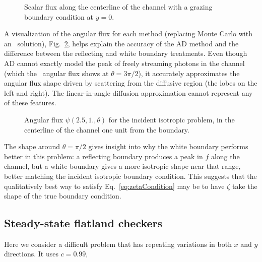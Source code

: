 \begin{figure}[htb]
  \centering\small
  \hspace{-.5in}
  
  \hspace{-.5in}
  \caption{Scalar flux along the centerline of the channel with a grazing
  boundary condition at $y=0$.}
  \label{fig:bcChannelGrazing}
\end{figure}

A visualization of the angular flux for each method (replacing Monte Carlo with
an \SN\ solution), Fig.~\ref{fig:bcChannelIsotropicAngular}, helps explain the
accuracy
of the AD method and the difference between the reflecting and white boundary
treatments. Even though AD cannot exactly model the peak of freely streaming
photons in the channel (which the \SN\ angular flux shows at $\theta=3\pi/2$),
it accurately approximates the angular flux shape driven by scattering from the
diffusive region (the lobes on the left and right).
The linear-in-angle diffusion approximation cannot represent any of these
features.  

\begin{figure}[htb!]
  \centering\small
  \vspace{-.25in}
  \hspace{-.5in}
  
  \hspace{-.5in}
  \vspace{-.25in}
  \caption{Angular flux $\psi(2.5, 1., \theta)$ for the incident isotropic
  problem, in the centerline of the channel one unit from the boundary.}
  \label{fig:bcChannelIsotropicAngular}
\end{figure}

The shape around $\theta=\pi/2$ gives insight into why the white boundary
performs better in this problem: a reflecting boundary produces a peak in $f$
along the channel, but a white boundary gives a more isotropic shape near that
range, better matching the incident isotropic boundary condition. This suggests
that the qualitatively best way to satisfy Eq.~\eqref{eq:zetaCondition} may be
to have $\zeta$ take the shape of the true boundary condition.

\clearpage
\subsection{Steady-state flatland checkers}

Here we consider a difficult problem that has repeating variations in both $x$
and $y$ directions. It uses $c=0.99$, 


